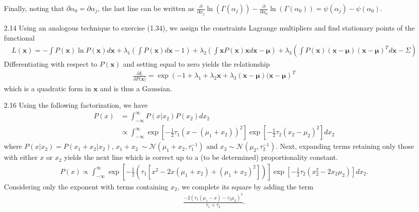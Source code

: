 \documentclass[]{article}
\begin{document}
\begin{enumerate}
	Finally, noting that $\partial \alpha_0 = \partial \alpha_j$, the last line can be written as $\frac{\partial}{\partial \alpha_j} \ln (\Gamma(\alpha_j)) - \frac{\partial}{\partial \alpha_0} \ln (\Gamma(\alpha_0))=\psi(\alpha_j) - \psi(\alpha_0)$.
	\item[2.14] Using an analogous technique to exercise (1.34), we assign the constraints Lagrange multipliers and find stationary points of the functional 
	\begin{align*}
	L(\mathbf{x}) = -\int P(\mathbf{x})\ln P(\mathbf{x})d\mathbf{x} + \lambda_1 \left( \int P(\mathbf{x})d\mathbf{x} - 1 \right) + \lambda_2 \left( \int \mathbf{x}P(\mathbf{x})\mathbf{x} d\mathbf{x} - \bm{\mu} \right) + \lambda_3 \left( \int P(\mathbf{x})(\mathbf{x} -  \bm{\mu})(\mathbf{x} - \bm{\mu})^T d\mathbf{x} - \Sigma \right)
	\end{align*}
	Differentiating with respect to $P(\mathbf{x})$ and setting equal to zero yields the relationship
	\begin{align*}
	\frac{\partial L}{\partial P(\mathbf{x)}} = \exp \left( -1 + \lambda_1 + \lambda_2 \mathbf{x} + \lambda_3 (\mathbf{x} - \bm{\mu})(\mathbf{x} - \bm{\mu} \right)^T
	\end{align*}
	which is a quadratic form in $\mathbf{x}$ and is thus a Gaussian.
	\item[2.16] Using the following factorization, we have
	\begin{align*}
	P(x) &= \int_{-\infty}^{\infty} P(x | x_2)P(x_2) dx_2 \\
	&\propto \int_{-\infty}^{\infty} \exp \left[-\frac{1}{2} \tau_1(x - (\mu_1 + x_2))^2 \right] \exp \left[-\frac{1}{2}\tau_2(x_2 - \mu_2)^2\right]dx_2
	\end{align*}
	where $P(x|x_2)=P(x_1 + x_2|x_2)$, $x_1 + x_2 ~\sim \mathcal{N}(\mu_1 + x_2, \tau_1^{-1})$ and $x_2 \sim \mathcal{N}(\mu_2, \tau_2^{-1})$. Next, expanding terms retaining only those with either $x$ or $x_2$ yields the next line which is correct up to a (to be determined) proportionality constant.
	\begin{align*}
	P(x) \propto \int_{-\infty}^{\infty} \exp \left[-\frac{1}{2} \left( \tau_1\left[x^2 - 2x(\mu_1 + x_2) + (\mu_1 + x_2)^2\right] \right) \right] \exp \left[ -\frac{1}{2}\tau_2 (x_2^2 - 2x_2\mu_2) \right] dx_2.
	\end{align*}
	Considering only the exponent with terms containing $x_2$, we complete its square by adding the term
	\begin{align*}
	\frac{-2(\tau_1(\mu_1-x)-\tau_2\mu_2)^2}{\tau_1 + \tau_2}.

\end{align*}
\end{enumerate}
\end{document}
